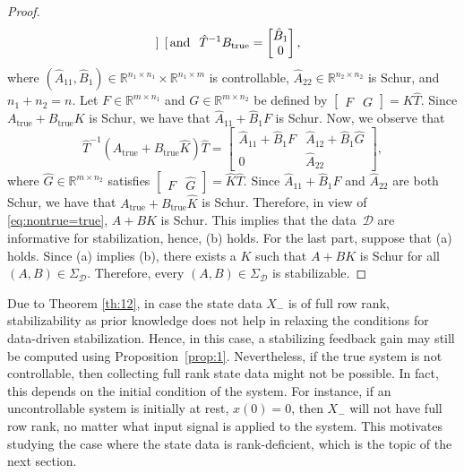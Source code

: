 \documentclass[9pt,shortpaper,twoside,web]{ieeecolor}
\begin{document}
\begin{proof}
\begin{equation}
\begin{bmatrix}
\end{bmatrix} \hspace{0.25 cm} \text{and} \hspace{0.25 cm} \hat{T}^{-1}B_\text{true}=\begin{bmatrix}
\hat{B}_1 \\ 0
\end{bmatrix},
\end{equation}
where $(\hat{A}_{11},\hat{B}_1)\in\mathbb{R}^{n_1\times n_1}\times \mathbb{R}^{n_1\times m}$ is controllable, \mbox{$\hat{A}_{22}\in\mathbb{R}^{n_2\times n_2}$} is Schur, and $n_1+n_2=n$.  Let $F\in\mathbb{R}^{m\times n_1}$ and $G\in\mathbb{R}^{m\times n_2}$ be defined by $\begin{bmatrix}
F & G
\end{bmatrix}=K\hat{T}$. Since $A_\text{true}+B_\text{true}K$ is Schur, we have that $\hat{A}_{11}+\hat{B}_1F$ is Schur. Now, we observe that
\begin{equation}
\hat{T}^{-1}(A_\text{true}+B_\text{true}\hat{K})\hat{T}=\begin{bmatrix}
\hat{A}_{11}+\hat{B}_1F & \hat{A}_{12}+\hat{B}_1\hat{G} \\
0 & \hat{A}_{22}
\end{bmatrix},
\end{equation}
where $\hat{G}\in\mathbb{R}^{m\times n_2}$ satisfies $\begin{bmatrix}
F & \hat{G}
\end{bmatrix}=\hat{K}\hat{T}$. Since $\hat{A}_{11}+\hat{B}_1F$ and $\hat{A}_{22}$ are both Schur, we have that \mbox{$A_\text{true}+B_\text{true}\hat{K}$} is Schur. Therefore, in view of \eqref{eq:nontrue=true}, $A+B\hat{K}$ is Schur. This implies that the \mbox{data $\mathcal{D}$} are informative for stabilization, hence, (b) holds. For the last part, suppose that (a) holds. Since (a) implies (b), there exists a $K$ such that $A+BK$ is Schur for all $(A,B)\in\Sigma_\mathcal{D}$. Therefore, every \mbox{$(A,B)\in\Sigma_\mathcal{D}$} is stabilizable.
\end{proof}

Due to Theorem \ref{th:12}, in case the state data $X_-$ is of full row rank, stabilizability as prior knowledge does not help in relaxing the conditions for data-driven stabilization. Hence, in this case, a stabilizing feedback gain may still be computed using Proposition~\ref{prop:1}. Nevertheless, if the true system is not controllable, then collecting full rank state data might not be possible. In fact, this depends on the initial condition of the system. For instance, if an uncontrollable system is initially at rest, $x(0)=0$, then $X_-$ will not have full row rank, no matter what input signal is applied to the system. This motivates studying the case where the state data is rank-deficient, which is the topic of the next section.
\end{document}
